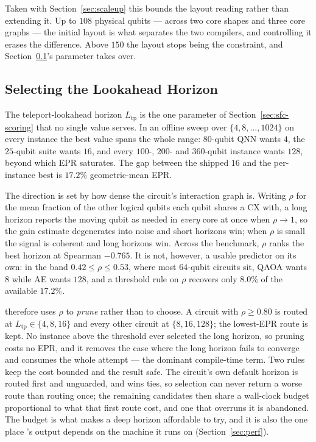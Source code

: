 Taken with Section~\ref{sec:scaleup} this bounds the layout reading
rather than extending it. Up to $108$ physical qubits --- across two
core shapes and three core graphs --- the initial layout is what
separates the two compilers, and controlling it erases the difference.
Above $150$ the layout stops being the constraint, and
Section~\ref{sec:horizon}'s parameter takes over.

\subsection{Selecting the Lookahead Horizon}
\label{sec:horizon}

The teleport-lookahead horizon $L_\mathrm{tp}$ is the one parameter of
Section~\ref{sec:sfc-scoring} that no single value serves. In an
offline sweep over $\{4,8,\dots,1024\}$ on every instance the best value
spans the whole range: $80$-qubit QNN wants $4$, the $25$-qubit suite
wants $16$, and every $100$-, $200$- and $360$-qubit instance wants
$128$, beyond which EPR saturates. The gap between the shipped $16$ and
the per-instance best is $17.2\%$ geometric-mean EPR.

The direction is set by how dense the circuit's interaction graph is.
Writing $\rho$ for the mean fraction of the other logical qubits each
qubit shares a CX with, a long horizon reports the moving qubit as needed
in \emph{every} core at once when $\rho\to1$, so the gain estimate
degenerates into noise and short horizons win; when $\rho$ is small the
signal is coherent and long horizons win. Across the benchmark, $\rho$
ranks the best horizon at Spearman $-0.765$. It is not, however, a
usable predictor on its own: in the band $0.42\le\rho\le0.53$, where most
$64$-qubit circuits sit, QAOA wants $8$ while AE wants $128$, and a
threshold rule on $\rho$ recovers only $8.0\%$ of the available
$17.2\%$.

\PORTER{} therefore uses $\rho$ to \emph{prune} rather than to choose. A
circuit with $\rho\ge0.80$ is routed at $L_\mathrm{tp}\in\{4,8,16\}$ and
every other circuit at $\{8,16,128\}$; the lowest-EPR route is kept. No
instance above the threshold ever selected the long horizon, so pruning
costs no EPR, and it removes the case where the long horizon fails to
converge and consumes the whole attempt --- the dominant compile-time
term. Two rules keep the cost bounded and the result safe. The
circuit's own default horizon is routed first and unguarded, and wins
ties, so selection can never return a worse route than routing once;
the remaining candidates then share a wall-clock budget proportional to
what that first route cost, and one that overruns it is abandoned. The
budget is what makes a deep horizon affordable to try, and it is also
the one place \PORTER{}'s output depends on the machine it runs on
(Section~\ref{sec:perf}).


